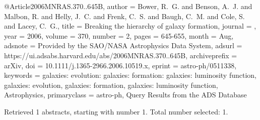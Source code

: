 \documentclass[longauth]{aa}
\begin{document}
{{{{@Article{2006MNRAS.370..645B,
  author        = {{Bower}, R.~G. and {Benson}, A.~J. and {Malbon}, R. and {Helly}, J.~C. and {Frenk}, C.~S. and {Baugh}, C.~M. and {Cole}, S. and {Lacey}, C.~G.},
  title         = {Breaking the hierarchy of galaxy formation},
  journal       = {\mnras},
  year          = {2006},
  volume        = {370},
  number        = {2},
  pages         = {645-655},
  month         = {Aug},
  adsnote       = {Provided by the SAO/NASA Astrophysics Data System},
  adsurl        = {https://ui.adsabs.harvard.edu/abs/2006MNRAS.370..645B},
  archiveprefix = {arXiv},
  doi           = {10.1111/j.1365-2966.2006.10519.x},
  eprint        = {astro-ph/0511338},
  keywords      = {galaxies: evolution: galaxies: formation: galaxies: luminosity function, galaxies: evolution, galaxies: formation, galaxies: luminosity function, Astrophysics},
  primaryclass  = {astro-ph},
}
Query Results from the ADS Database


Retrieved 1 abstracts, starting with number 1.  Total number selected: 1.

}}}}
\end{document}

